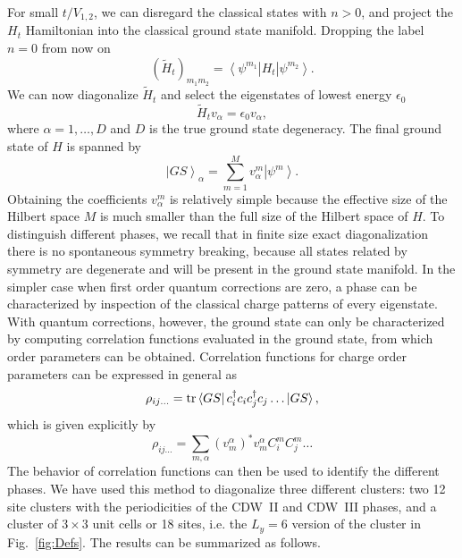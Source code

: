 \documentclass[aps,prx,10pt,twocolumn,floatfix,superscriptaddress,showpacs,numerical,footinbib]{revtex4-1}
\begin{document}
For small $t/V_{1,2}$, we can disregard the classical states with $n>0$, and project the $H_t$ Hamiltonian into the classical ground state manifold. 
%
Dropping the label $n=0$ from now on
%
\begin{equation}
(\tilde{H}_t)_{m_1m_2} =  \left< \psi^{m_1} \right| H_t \left| \psi^{m_2} \right>.
\end{equation}
%
We can now diagonalize $\tilde{H}_t$ and select the eigenstates of lowest energy $\epsilon_0$
%
\begin{equation}
\tilde{H}_t v_\alpha = \epsilon_0 v_\alpha,
\end{equation}
%
where $\alpha = 1,\ldots,D$ and $D$ is the true ground state degeneracy. The final ground state of $H$ is spanned by
%
\begin{equation}
\left| GS\right>_\alpha = \sum_{m=1}^M v^m_\alpha \left| \psi^m\right>.
\end{equation}
%
Obtaining the coefficients $v^m_\alpha$ is relatively simple because the effective size of the Hilbert space $M$ is much smaller than the full size of the Hilbert space of $H$.
%
To distinguish different phases, we recall that in finite size exact diagonalization there is no spontaneous symmetry breaking, because all states related by symmetry are degenerate and will be present in the ground state manifold. 
%
In the simpler case when first order quantum corrections are zero, a phase can be characterized by inspection of the classical charge patterns of every eigenstate. 
%
With quantum corrections, however, the ground state can only be characterized by computing correlation functions evaluated in the ground state, from which order parameters can be obtained. 
%
Correlation functions for charge order parameters can be expressed in general as
%
\begin{equation}
\rho_{ij\ldots} = {\rm tr} \left< GS \right| c^\dagger_i c_ic^\dagger_j c_j \ldots \left| GS \right>, 
\end{equation}
%
which is given explicitly by
%
\begin{equation}
\rho_{ij\ldots} = \sum_{m,\alpha} (v_m^\alpha)^*v_m^\alpha C^m_i C^m_j \dots
\end{equation}
%
The behavior of correlation functions can then be used to identify the different phases. 
%
We have used this method to diagonalize three different clusters: two 12 site clusters with the periodicities of the CDW~II and CDW~III phases, 
%
and a cluster of $3\times3$ unit cells or 18 sites, i.e. the $L_y=6$ version of the cluster in Fig.~\ref{fig:Defs}. 
%
The results can be summarized as follows. \\
\end{document}

